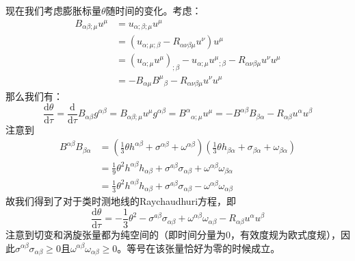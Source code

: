 \documentclass[hyperref, UTF8, a4paper]{ctexart}
\begin{document}
现在我们考虑膨胀标量$\theta $随时间的变化。考虑：
\begin{equation*}
	\begin{aligned}
		B_{\alpha \beta ;\mu } u^{\mu } & =u_{\alpha ;\beta ;\mu } u^{\mu }\\
		& =(u_{\alpha ;\mu ;\beta } -R_{\alpha \nu \beta \mu } u^{\nu } )u^{\mu }\\
		& =(u_{\alpha ;\mu } u^{\mu } )_{;\beta } -u_{\alpha ;\mu } u^{\mu }{}_{;\beta } -R_{\alpha \nu \beta \mu } u^{\nu } u^{\mu }\\
		& =-B_{\alpha \mu } B^{\mu }{}_{\beta } -R_{\alpha \nu \beta \mu } u^{\nu } u^{\mu }
	\end{aligned}
\end{equation*}
那么我们有：
\begin{equation*}
	\frac{\mathrm{d} \theta }{\mathrm{d} \tau } =\frac{\mathrm{d}}{\mathrm{d} \tau } B_{\alpha \beta } g^{\alpha \beta } =B_{\alpha \beta ;\mu } u^{\mu } g^{\alpha \beta } =B^{\alpha }{}_{\alpha ;\mu } u^{\mu } =-B^{\alpha \beta } B_{\beta \alpha } -R_{\alpha \beta } u^{\alpha } u^{\beta }
\end{equation*}
注意到
\begin{equation*}
	\begin{aligned}
		B^{\alpha \beta } B_{\beta \alpha } & =\left(\frac{1}{3} \theta h^{\alpha \beta } +\sigma ^{\alpha \beta } +\omega ^{\alpha \beta }\right)\left(\frac{1}{3} \theta h_{\beta \alpha } +\sigma _{\beta \alpha } +\omega _{\beta \alpha }\right)\\
		& =\frac{1}{9} \theta ^{2} h^{\alpha \beta } h_{\alpha \beta } +\sigma ^{a\beta } \sigma _{\alpha \beta } +\omega ^{\alpha \beta } \omega _{\beta \alpha }\\
		& =\frac{1}{3} \theta ^{2} h^{\alpha \beta } h_{\alpha \beta } +\sigma ^{a\beta } \sigma _{\alpha \beta } -\omega ^{\alpha \beta } \omega _{\alpha \beta }
	\end{aligned}
\end{equation*}
故我们得到了对于类时测地线的Raychaudhuri方程，即
\begin{equation*}
	\boxed{\frac{\mathrm{d} \theta }{\mathrm{d} \tau } =-\frac{1}{3} \theta ^{2} -\sigma ^{a\beta } \sigma _{\alpha \beta } +\omega ^{\alpha \beta } \omega _{\alpha \beta } -R_{\alpha \beta } u^{\alpha } u^{\beta }}
\end{equation*}
注意到切变和涡旋张量都为纯空间的（即时间分量为0，有效度规为欧式度规），因此$\sigma ^{\alpha \beta } \sigma _{\alpha \beta } \geq 0$且$\omega ^{\alpha \beta } \omega _{\alpha \beta } \geq 0$。等号在该张量恰好为零的时候成立。
\end{document}
